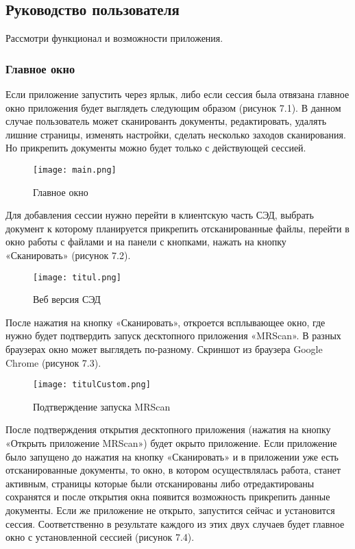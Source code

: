 \subsection{Руководство пользователя}

Рассмотри функционал и возможности приложения.

\subsubsection{Главное окно}

Если приложение запустить через ярлык, либо если сессия была отвязана главное окно приложения будет выглядеть следующим образом (рисунок 7.1). В данном случае пользователь может сканированть документы, редактировать, удалять лишние страницы, изменять настройки, сделать несколько заходов сканирования. Но прикрепить документы можно будет только с действующей сессией.

\begin{figure}[h!]
\centering
	\texttt{[image: main.png]}
	\caption{Главное окно}
	\clearpage
\end{figure}

Для добавления сессии нужно перейти в клиентскую часть СЭД, выбрать документ к которому планируется прикрепить отсканированные файлы, перейти в окно работы с файлами и на панели с кнопками, нажать на кнопку «Сканировать» (рисунок 7.2).

\begin{figure}[h!]
\centering
	\texttt{[image: titul.png]}
	\caption{Веб версия СЭД}
	\clearpage
\end{figure}

После нажатия на кнопку «Сканировать», откроется всплывающее окно, где нужно будет подтвердить запуск десктопного приложения «MRScan». В разных браузерах окно может выглядеть по-разному. Скриншот из браузера Google Chrome (рисунок 7.3).

\begin{figure}[h!]
\centering
	\texttt{[image: titulCustom.png]}
	\caption{Подтверждение запуска MRScan}
	\clearpage
\end{figure}

После подтверждения открытия десктопного приложения (нажатия на кнопку «Открыть приложение MRScan») будет окрыто приложение. Если приложение было запущено до нажатия на кнопку «Сканировать» и в приложении уже есть отсканированные документы, то окно, в котором осуществлялась работа, станет активным, страницы которые были отсканированы либо отредактированы сохранятся и после открытия окна появится возможность прикрепить данные документы. Если же приложение не открыто, запустится сейчас и установится сессия. Соответственно в результате каждого из этих двух случаев будет главное окно с установленной сессией (рисунок 7.4). 

